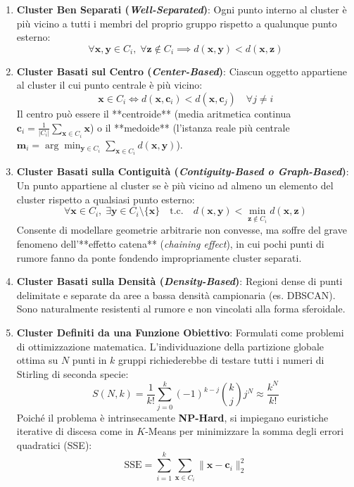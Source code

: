\begin{enumerate}
    \item \textbf{Cluster Ben Separati (\textit{Well-Separated})}:
    Ogni punto interno al cluster è più vicino a tutti i membri del proprio gruppo rispetto a qualunque punto esterno:
    \begin{equation}
        \forall \mathbf{x}, \mathbf{y} \in C_i, \; \forall \mathbf{z} \notin C_i \implies d(\mathbf{x}, \mathbf{y}) < d(\mathbf{x}, \mathbf{z})
    \end{equation}
    \item \textbf{Cluster Basati sul Centro (\textit{Center-Based})}:
    Ciascun oggetto appartiene al cluster il cui punto centrale è più vicino:
    \begin{equation}
        \mathbf{x} \in C_i \iff d(\mathbf{x}, \mathbf{c}_i) < d(\mathbf{x}, \mathbf{c}_j) \quad \forall j \neq i
    \end{equation}
    Il centro può essere il **centroide** (media aritmetica continua $\mathbf{c}_i = \frac{1}{|C_i|} \sum_{\mathbf{x} \in C_i} \mathbf{x}$) o il **medoide** (l'istanza reale più centrale $\mathbf{m}_i = \arg\min_{\mathbf{y} \in C_i} \sum_{\mathbf{x} \in C_i} d(\mathbf{x}, \mathbf{y})$).
    \item \textbf{Cluster Basati sulla Contiguità (\textit{Contiguity-Based o Graph-Based})}:
    Un punto appartiene al cluster se è più vicino ad almeno un elemento del cluster rispetto a qualsiasi punto esterno:
    \begin{equation}
        \forall \mathbf{x} \in C_i, \; \exists \mathbf{y} \in C_i \setminus \{\mathbf{x}\} \quad \text{t.c.} \quad d(\mathbf{x}, \mathbf{y}) < \min_{\mathbf{z} \notin C_i} d(\mathbf{x}, \mathbf{z})
    \end{equation}
    Consente di modellare geometrie arbitrarie non convesse, ma soffre del grave fenomeno dell'**effetto catena** (\textit{chaining effect}), in cui pochi punti di rumore fanno da ponte fondendo impropriamente cluster separati.
    \item \textbf{Cluster Basati sulla Densità (\textit{Density-Based})}:
    Regioni dense di punti delimitate e separate da aree a bassa densità campionaria (es. DBSCAN). Sono naturalmente resistenti al rumore e non vincolati alla forma sferoidale.
    \item \textbf{Cluster Definiti da una Funzione Obiettivo}:
    Formulati come problemi di ottimizzazione matematica. L'individuazione della partizione globale ottima su $N$ punti in $k$ gruppi richiederebbe di testare tutti i numeri di Stirling di seconda specie:
    \begin{equation}
        S(N, k) = \frac{1}{k!} \sum_{j=0}^k (-1)^{k-j} \binom{k}{j} j^N \approx \frac{k^N}{k!}
    \end{equation}
    Poiché il problema è intrinsecamente \textbf{NP-Hard}, si impiegano euristiche iterative di discesa come in $K$-Means per minimizzare la somma degli errori quadratici (SSE):
    \begin{equation}
        \text{SSE} = \sum_{i=1}^k \sum_{\mathbf{x} \in C_i} \|\mathbf{x} - \mathbf{c}_i\|_2^2
    \end{equation}
\end{enumerate}

